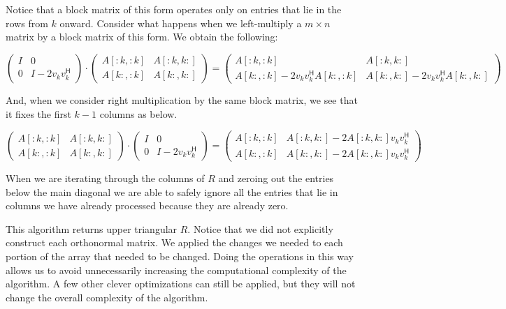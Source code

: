 Notice that a block matrix of this form operates only on entries that lie in the rows from $k$ onward.
Consider what happens when we left-multiply a $m \times n$ matrix by a block matrix of this form.
We obtain the following:

\[
\begin{pmatrix}
I & 0 \\
0 & I - 2 v_k v_k^\mathsf{H}
\end{pmatrix}
\cdot
\begin{pmatrix}
A[:k,:k] & A[:k,k:] \\
A[k:,:k] & A[k:,k:]
\end{pmatrix}
=
\begin{pmatrix}
A[:k,:k] & A[:k,k:] \\
A[k:,:k] - 2 v_k v_k^\mathsf{H} A[k:,:k] & A[k:,k:] - 2 v_k v_k^\mathsf{H} A[k:,k:]
\end{pmatrix}
\]

And, when we consider right multiplication by the same block matrix, we see that it fixes the first $k-1$ columns as below.

\[
\begin{pmatrix}
A[:k,:k] & A[:k,k:] \\
A[k:,:k] & A[k:,k:]
\end{pmatrix}
\cdot
\begin{pmatrix}
I & 0 \\
0 & I - 2 v_k v_k^\mathsf{H}
\end{pmatrix}
=
\begin{pmatrix}
A[:k,:k] & A[:k,k:] - 2  A[:k,k:] v_k v_k^\mathsf{H} \\
A[k:,:k] & A[k:,k:] - 2 A[k:,k:] v_k v_k^\mathsf{H}
\end{pmatrix}
\]

When we are iterating through the columns of $R$ and zeroing out the entries below the main diagonal we are able to safely ignore all the entries that lie in columns we have already processed because they are already zero.

This algorithm returns upper triangular $R$.
Notice that we did not explicitly construct each orthonormal matrix.
We applied the changes we needed to each portion of the array that needed to be changed.
Doing the operations in this way allows us to avoid unnecessarily increasing the computational complexity of the algorithm.
A few other clever optimizations can still be applied, but they will not change the overall complexity of the algorithm.

